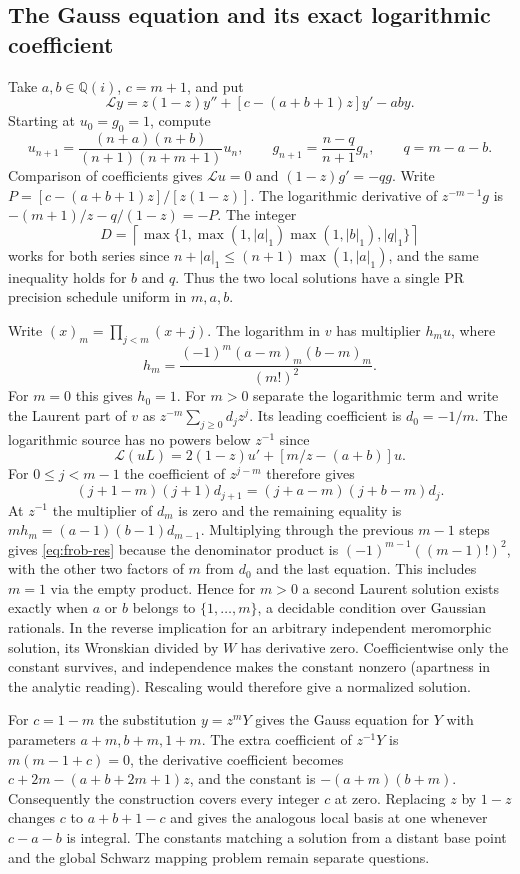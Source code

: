 \subsection{The Gauss equation and its exact logarithmic coefficient}
Take $a,b\in\mathbb Q(i)$, $c=m+1$, and put
\[
 \mathcal L y=z(1-z)y''+[c-(a+b+1)z]y'-aby.
\]
Starting at $u_0=g_0=1$, compute
\[
 u_{n+1}=\frac{(n+a)(n+b)}{(n+1)(n+m+1)}u_n,\qquad
 g_{n+1}=\frac{n-q}{n+1}g_n,\qquad q=m-a-b .
\]
Comparison of coefficients gives $\mathcal L u=0$ and
$(1-z)g'=-qg$. Write $P=[c-(a+b+1)z]/[z(1-z)]$.
The logarithmic derivative of $z^{-m-1}g$ is
$-(m+1)/z-q/(1-z)=-P$. The integer
\[
 D=\left\lceil\max\{1,\max(1,|a|_1)\max(1,|b|_1),|q|_1\}\right\rceil
\]
works for both series since $n+|a|_1\le(n+1)\max(1,|a|_1)$,
and the same inequality holds for $b$ and $q$. Thus the two local
solutions have a single PR precision schedule uniform in $m,a,b$.

Write $(x)_m=\prod_{j<m}(x+j)$. The logarithm in $v$ has multiplier $h_m u$,
where
\begin{equation}
             h_m=\frac{(-1)^m(a-m)_m(b-m)_m}{(m!)^2}.        \label{eq:frob-res}
\end{equation}
For $m=0$ this gives $h_0=1$. For $m>0$ separate the logarithmic term and
write the Laurent part of $v$ as $z^{-m}\sum_{j\ge0}d_jz^j$. Its leading
coefficient is $d_0=-1/m$. The logarithmic source has no powers below
$z^{-1}$ since
\[
 \mathcal L(u L)=2(1-z)u'+[m/z-(a+b)]u .
\]
For $0\le j<m-1$ the coefficient of $z^{j-m}$ therefore gives
\[
 (j+1-m)(j+1)d_{j+1}=(j+a-m)(j+b-m)d_j.
\]
At $z^{-1}$ the multiplier of $d_m$ is zero and the remaining equality is
$m h_m=(a-1)(b-1)d_{m-1}$. Multiplying through the previous $m-1$ steps
gives \eqref{eq:frob-res} because the denominator product is
$(-1)^{m-1}((m-1)!)^2$, with the other two factors of $m$ from $d_0$ and
the last equation. This includes $m=1$ via the empty product.
Hence for $m>0$ a second Laurent solution exists exactly when
$a$ or $b$ belongs to $\{1,\dots,m\}$, a decidable condition over Gaussian
rationals. In the reverse implication for an arbitrary independent
meromorphic solution, its Wronskian divided by $W$ has derivative zero.
Coefficientwise only the constant survives, and independence makes the
constant nonzero (apartness in the analytic reading). Rescaling would
therefore give a normalized solution.

For $c=1-m$ the substitution $y=z^mY$ gives the Gauss equation for $Y$
with parameters $a+m,b+m,1+m$. The extra coefficient of $z^{-1}Y$
is $m(m-1+c)=0$, the derivative coefficient becomes
$c+2m-(a+b+2m+1)z$, and the constant is $-(a+m)(b+m)$.
Consequently the construction covers every integer $c$ at zero.
Replacing $z$ by $1-z$ changes $c$ to $a+b+1-c$ and gives the analogous
local basis at one whenever $c-a-b$ is integral. The constants matching a
solution from a distant base point and the global Schwarz mapping problem
remain separate questions.

